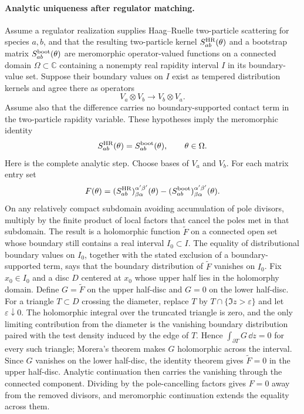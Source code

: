\paragraph{Analytic uniqueness after regulator matching.}
Assume a regulator realization supplies Haag--Ruelle two-particle scattering
for species \(a,b\), and that the resulting two-particle kernel
\(S^{\rm HR}_{ab}(\theta)\) and a bootstrap matrix
\(S^{\rm boot}_{ab}(\theta)\) are meromorphic operator-valued functions on a
connected domain \(\Omega\subset\mathbb C\) containing a nonempty real
rapidity interval \(I\) in its boundary-value set.  Suppose their boundary
values on \(I\) exist as tempered distribution kernels and agree there as
operators
\[
  V_a\otimes V_b\longrightarrow V_b\otimes V_a .
\]
Assume also that the difference carries no boundary-supported contact term in
the two-particle rapidity variable.  These hypotheses imply the meromorphic
identity
\[
  S^{\rm HR}_{ab}(\theta)=S^{\rm boot}_{ab}(\theta),
  \qquad \theta\in\Omega .
\]
Here is the complete analytic step.  Choose bases of \(V_a\) and \(V_b\).
For each matrix entry set
\[
  F(\theta)=
  (S^{\rm HR}_{ab})_{\beta\alpha}^{\alpha'\beta'}(\theta)
  -
  (S^{\rm boot}_{ab})_{\beta\alpha}^{\alpha'\beta'}(\theta).
\]
On any relatively compact subdomain avoiding accumulation of pole divisors,
multiply by the finite product of local factors that cancel the poles met in
that subdomain.  The result is a holomorphic function \(\widetilde F\) on a
connected open set whose boundary still contains a real interval
\(I_0\subset I\).  The equality of distributional boundary values on \(I_0\),
together with the stated exclusion of a boundary-supported term, says that the
boundary distribution of \(\widetilde F\) vanishes on \(I_0\).  Fix
\(x_0\in I_0\) and a disc \(D\) centered at \(x_0\) whose upper half lies in
the holomorphy domain.  Define \(G=\widetilde F\) on the upper half-disc and
\(G=0\) on the lower half-disc.  For a triangle \(T\subset D\) crossing the
diameter, replace \(T\) by \(T\cap\{\Im z>\varepsilon\}\) and let
\(\varepsilon\downarrow0\).  The holomorphic integral over the truncated
triangle is zero, and the only limiting contribution from the diameter is the
vanishing boundary distribution paired with the test density induced by the
edge of \(T\).  Hence \(\int_{\partial T}G\,\dd z=0\) for every such triangle;
Morera's theorem makes \(G\) holomorphic across the interval.  Since \(G\)
vanishes on the lower half-disc, the identity theorem gives
\(\widetilde F=0\) in the upper half-disc.  Analytic continuation then carries
the vanishing through the connected component.  Dividing by the pole-cancelling
factors gives \(F=0\) away from the removed divisors, and meromorphic
continuation extends the equality across them.

